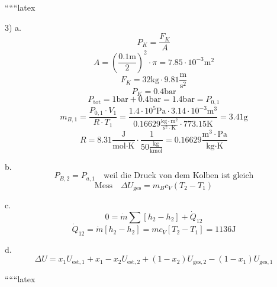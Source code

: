 
``````latex


3) a. 
\[
P_{K} = \frac{F_{K}}{A}
\]
\[
A = \left( \frac{0.1 \text{m}}{2} \right)^2 \cdot \pi = 7.85 \cdot 10^{-3} \text{m}^2
\]
\[
F_{K} = 32 \text{kg} \cdot 9.81 \frac{\text{m}}{\text{s}^2}
\]
\[
P_{K} = 0.4 \text{bar}
\]
\[
P_{\text{tot}} = 1 \text{bar} + 0.4 \text{bar} = 1.4 \text{bar} = P_{0,1}
\]
\[
m_{B,1} = \frac{P_{0,1} \cdot V_{1}}{R \cdot T_{1}} = \frac{1.4 \cdot 10^5 \text{Pa} \cdot 3.14 \cdot 10^{-3} \text{m}^3}{0.16629 \frac{\text{kg} \cdot \text{m}^2}{\text{s}^2 \cdot \text{K}} \cdot 773.15 \text{K}} = 3.41 \text{g}
\]
\[
R = 8.31 \frac{\text{J}}{\text{mol} \cdot \text{K}} \cdot \frac{1}{50 \frac{\text{kg}}{\text{kmol}}} = 0.16629 \frac{\text{m}^3 \cdot \text{Pa}}{\text{kg} \cdot \text{K}}
\]

b. 
\[
P_{B,2} = P_{a,1} \quad \text{weil die Druck von dem Kolben ist gleich}
\]
\[
\text{Mess} \quad \Delta U_{\text{ges}} = m_{B} c_{V} (T_{2} - T_{1})
\]

c. 
\[
0 = \dot{m} \sum \left[ h_{2} - h_{2} \right] + \dot{Q}_{12}
\]
\[
\dot{Q}_{12} = \dot{m} \left[ h_{2} - h_{2} \right] = m c_{V} \left[ T_{2} - T_{1} \right] = 1136 \text{J}
\]

d. 
\[
\Delta U = x_{1} U_{\text{est},1} + x_{1} - x_{2} U_{\text{est},2} + (1 - x_{2}) U_{\text{ges},2} - (1 - x_{1}) U_{\text{ges},1}
\]

``````latex


